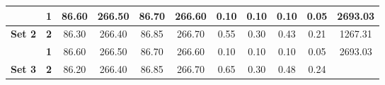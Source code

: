 \begin{table}[]
\begin{tabular}{|cc|cc|cc|c|c|c|c|c|}
		\multicolumn{1}{|c|}{}                                &
		\textbf{1}                                            &
		\multicolumn{1}{c|}{86.60}                            &
		266.50                                                &
		\multicolumn{1}{c|}{86.70}                            &
		266.60                                                &
		0.10                                                  &
		0.10                                                  &
		0.10                                                  &
		0.05                                                  &
		2693.03                                                 \\ \hline
		\multicolumn{1}{|c|}{\multirow{2}{*}{\textbf{Set 2}}} &
		\textbf{2}                                            &
		\multicolumn{1}{c|}{86.30}                            &
		266.40                                                &
		\multicolumn{1}{c|}{86.85}                            &
		266.70                                                &
		0.55                                                  &
		0.30                                                  &
		0.43                                                  &
		0.21                                                  &
		1267.31                                                 \\ \cline{2-11}
		\multicolumn{1}{|c|}{}                                &
		\textbf{1}                                            &
		\multicolumn{1}{c|}{86.60}                            &
		266.50                                                &
		\multicolumn{1}{c|}{86.70}                            &
		266.60                                                &
		0.10                                                  &
		0.10                                                  &
		0.10                                                  &
		0.05                                                  &
		2693.03                                                 \\ \hline
		\multicolumn{1}{|c|}{\multirow{2}{*}{\textbf{Set 3}}} &
		\textbf{2}                                            &
		\multicolumn{1}{c|}{86.20}                            &
		266.40                                                &
		\multicolumn{1}{c|}{86.85}                            &
		266.70                                                &
		0.65                                                  &
		0.30                                                  &
		0.48                                                  &
		0.24                                                  &

\end{tabular}
\end{table}
